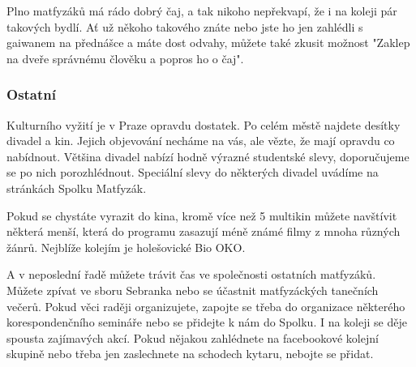 Plno matfyzáků má rádo dobrý čaj, a tak nikoho nepřekvapí, že i na koleji pár takových bydlí. Ať už někoho takového znáte nebo jste ho jen zahlédli s gaiwanem na přednášce a máte dost odvahy, můžete také zkusit možnost "Zaklep na dveře správnému člověku a popros ho o čaj".


\subsubsection{Ostatní}
Kulturního vyžití je v Praze opravdu dostatek. Po celém městě najdete desítky divadel a kin. Jejich objevování necháme na vás, ale vězte, že mají opravdu co nabídnout. Většina divadel nabízí hodně výrazné studentské slevy, doporučujeme se po nich porozhlédnout. Speciální slevy do některých divadel uvádíme na stránkách Spolku Matfyzák.

Pokud se chystáte vyrazit do kina, kromě více než 5 multikin můžete navštívit některá menší, která do programu zasazují méně známé filmy z mnoha různých žánrů. Nejblíže kolejím je holešovické Bio OKO.

A v neposlední řadě můžete trávit čas ve společnosti ostatních matfyzáků. Můžete zpívat ve sboru Sebranka nebo se účastnit matfyzáckých tanečních večerů. Pokud věci raději organizujete, zapojte se třeba do organizace některého korespondenčního semináře nebo se přidejte k nám do Spolku. I na koleji se děje spousta zajímavých akcí. Pokud nějakou zahlédnete na facebookové kolejní skupině nebo třeba jen zaslechnete na schodech kytaru, nebojte se přidat.